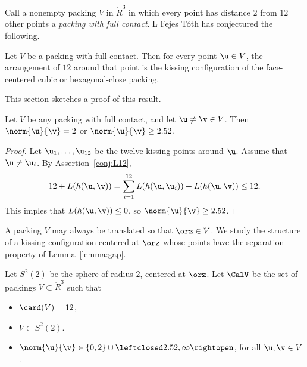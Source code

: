 Call a nonempty packing $ V$ in $\ring{R}^3$ in which every point has
distance $2$ from $12$ other points a {\it packing with full
  contact}. L Fejes T\'oth has conjectured the following.
%
%
%


\begin{theorem}\label{thm:fc} 
  Let $ V$ be a packing with full contact.  Then for every point $
  \u\in V$, the arrangement of $12$ around that point is the kissing
  configuration of the face-centered cubic or hexagonal-close packing.
\end{theorem}
%
%
%

This section  sketches a proof of this result.  


\begin{lemma}[] \label{lemma:gap}
  Let $V$ be any packing with full contact, and let $\u\ne\v\in V$.
  Then $\norm{\u}{\v}=2$ or $\norm{\u}{\v} \ge 2.52$.
\end{lemma}
%
%

\begin{proof} Let $ \u_1,\ldots, \u_{12}$ be the twelve kissing points
  around $\u$.  Assume that $\u\ne \u_i$.  By
  Assertion~\ref{conj:L12},
\begin{displaymath}
  12 + L(h( \u, \v)) 
  = \sum_{i=1}^{12} L(h( \u, \u_i)) + L(h( \u, \v)) \le 12.
\end{displaymath}
This imples that $L(h( \u, \v))\le 0$, so $\norm{ \u}{ \v}\ge 2.52$.
\end{proof}

A packing $V$ may always be translated so that $\orz\in V$.  We study
the structure of a kissing configuration centered at $\orz$ whose
points have the separation property of Lemma~\ref{lemma:gap}.

\begin{definition}[$S^2(2)$,~$\CalV$]
  Let $S^2(2)$ be the sphere of radius $2$, centered at $\orz$.  Let
  $\CalV$ be the set of packings $V\subset \ring{R}^3$ such that
\begin{itemize}
\item $\card(V) = 12$,
\item $V\subset S^2(2)$.
\item $\norm{\u}{\v} \in \{0,2\}\cup
  \leftclosed2.52,\infty\rightopen$, for all $\u,\v\in V$.
\end{itemize}
%
%
\end{definition}

